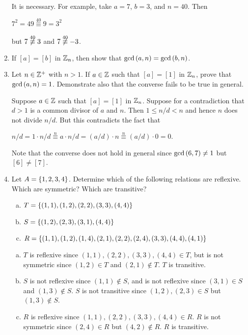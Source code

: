\documentclass[11pt,fleqn,dvipsnames,usenames]{article}
\newcommand{\p}{\noindent}
\begin{document}
\begin{enumerate}
\solution It is necessary.  For example, take $a = 7$, $b=3$, and $n=40$.  Then
\begin{center}
$7^2 = 49 \overset{40}{\equiv}9 = 3^2$
\end{center}
but $7\not\overset{40}{\equiv}3$ and $7\not\overset{40}{\equiv}-3$.

\item If $[a] = [b]$ in $\mathbb{Z}_{n}$, then show that $\text{gcd}\left(a,n\right) = \text{gcd}\left(b,n\right)$.


\item Let $n\in\mathbb{Z}^{+}$ with $n > 1$.  If $a\in \mathbb{Z}$ such that $[a] = [1]$ in $\mathbb{Z}_{n}$, prove that $\text{gcd}\left(a,n\right) = 1$.  Demonstrate also that the converse fails to be true in general.
\vsmsp

\solution Suppose $a\in\mathbb{Z}$ such that $[a] = [1]$ in $\mathbb{Z}_{n}$.  Suppose for a contradiction that $d>1$ is a common divisor of $a$ and $n$.  Then $1 \leq n/d < n$ and hence $n$ does not divide $n/d$.  But this contradicts the fact that
\begin{center}
$n/d = 1\cdot n/d \overset{n}{\equiv} a\cdot n/d = (a/d)\cdot n \overset{n}{\equiv}(a/d)\cdot 0 = 0$.
\end{center}
\vsmsp

\p Note that the converse does not hold in general since $\text{gcd}\left(6,7\right)\neq 1$ but $[6]\neq [7]$.

\item Let $A = \left\{1,2,3,4\right\}$.  Determine which of the following relations are reflexive.  Which are symmetric?  Which are transitive?
\begin{enumerate}[(a)]
\item $T = \left\{(1,1), (1,2), (2,2), (3,3), (4,4)\right\}$
\item $S = \left\{(1,2), (2,3), (3,1), (4,4)\right\}$
\item $R = \left\{(1,1), (1,2), (1,4), (2,1), (2,2), (2,4), (3,3), (4,4), (4,1)\right\}$
\end{enumerate}
\vsmsp

\solution
\begin{enumerate}[(a)]
\item $T$ is reflexive since $(1,1), (2,2), (3,3), (4,4)\in T$, but is not symmetric since $(1,2)\in T$ and $(2,1)\notin T$.  $T$ is transitive.
\item $S$ is not reflexive since $(1,1)\notin S$, and is not reflexive since $(3,1)\in S$ and $(1,3)\notin S$.  $S$ is not transitive since $(1,2),(2,3)\in S$ but $(1,3)\notin S$.
\item $R$ is reflexive since $(1,1), (2,2), (3,3), (4,4)\in R$.  $R$ is not symmetric since $(2,4)\in R$ but $(4,2)\notin R$.  $R$ is transitive.
\end{enumerate}


\end{enumerate}
\end{document}
